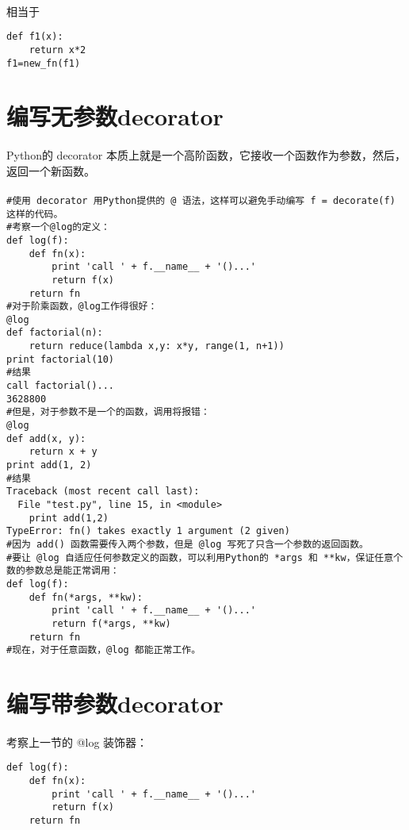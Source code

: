 \documentclass{article}
\begin{document}
\begin{CJK}{UTF8}{gbsn}
\paragraph{}
相当于
\begin{verbatim}
def f1(x):
    return x*2
f1=new_fn(f1)
\end{verbatim}
\section{编写无参数decorator}
\paragraph{}
Python的 decorator 本质上就是一个高阶函数，它接收一个函数作为参数，然后，返回一个新函数。
\paragraph{}
\begin{verbatim}
#使用 decorator 用Python提供的 @ 语法，这样可以避免手动编写 f = decorate(f) 这样的代码。
#考察一个@log的定义：
def log(f):
    def fn(x):
        print 'call ' + f.__name__ + '()...'
        return f(x)
    return fn
#对于阶乘函数，@log工作得很好：
@log
def factorial(n):
    return reduce(lambda x,y: x*y, range(1, n+1))
print factorial(10)
#结果
call factorial()...
3628800
#但是，对于参数不是一个的函数，调用将报错：
@log
def add(x, y):
    return x + y
print add(1, 2)
#结果
Traceback (most recent call last):
  File "test.py", line 15, in <module>
    print add(1,2)
TypeError: fn() takes exactly 1 argument (2 given)
#因为 add() 函数需要传入两个参数，但是 @log 写死了只含一个参数的返回函数。
#要让 @log 自适应任何参数定义的函数，可以利用Python的 *args 和 **kw，保证任意个数的参数总是能正常调用：
def log(f):
    def fn(*args, **kw):
        print 'call ' + f.__name__ + '()...'
        return f(*args, **kw)
    return fn
#现在，对于任意函数，@log 都能正常工作。
\end{verbatim}
\section{编写带参数decorator}
\paragraph{}
考察上一节的 @log 装饰器：
\begin{verbatim}
def log(f):
    def fn(x):
        print 'call ' + f.__name__ + '()...'
        return f(x)
    return fn
\end{verbatim}

\end{CJK}
\end{document}
